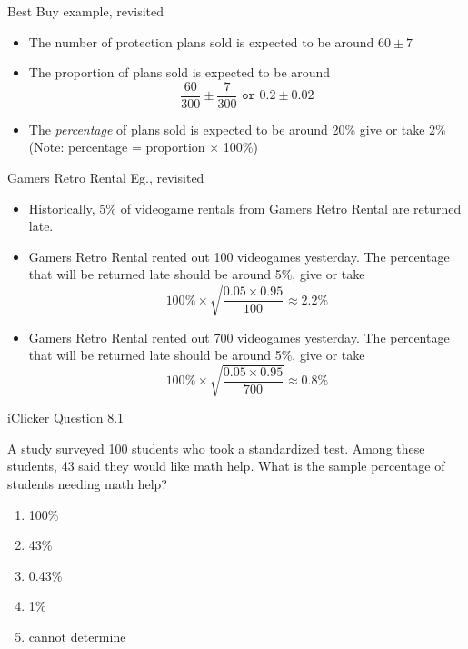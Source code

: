 \documentclass[14pt]{beamer}\usepackage[]{graphicx}\usepackage[]{color}
\begin{document}
\begin{frame}[fragile]{Best Buy example, revisited}

\begin{itemize}
\item<1-> The number of protection plans sold is expected to be around $60 \pm 7$

\item<2-> The proportion of plans sold is expected to be around
\begin{equation*}
  \frac{60}{300} \pm \frac{7}{300} \texttt{ or } 0.2 \pm 0.02
\end{equation*}

\item<3-> The \textit{percentage} of plans sold is expected to be around 20\%  give or take 2\% (Note: percentage = proportion $\times$ 100\%)
\end{itemize}
\end{frame}

\begin{frame}[fragile]{Gamers Retro Rental Eg., revisited}

{\footnotesize{
\begin{itemize}
\item<1-> Historically, 5\% of videogame rentals from Gamers Retro Rental are returned late.
\item<2-> Gamers Retro Rental rented out 100 videogames yesterday. The percentage  that will be returned late should be around 5\%, give or take
\begin{equation*}
100\% \times \sqrt{ \frac{ 0.05 \times 0.95}{100}} \approx 2.2\%
\end{equation*}
\item<3-> Gamers Retro Rental  rented out 700 videogames yesterday. The percentage  that will be returned late should be around 5\%, give or take
\begin{equation*}
100\% \times \sqrt{ \frac{ 0.05 \times 0.95}{700}} \approx 0.8\%
\end{equation*}
\end{itemize}
}}
\end{frame}

\begin{frame}[fragile]{iClicker Question 8.1}

A study surveyed 100 students who took a standardized test. Among  these students, 43 said they would like math help. What is the sample  percentage of students needing math help?

\begin{enumerate}
\item 100\%
\item 43\%
\item 0.43\%
\item 1\%
\item cannot determine
\end{enumerate}
\end{frame}
\end{document}
